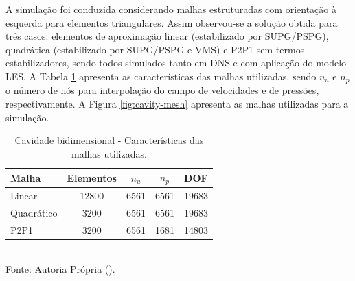 A simulação foi conduzida considerando malhas estruturadas com orientação à esquerda para elementos triangulares. Assim observou-se a solução obtida para três casos: elementos de aproximação linear (estabilizado por SUPG/PSPG), quadrática (estabilizado por SUPG/PSPG e VMS) e P2P1 sem termos estabilizadores, sendo todos simulados tanto em DNS e com aplicação do modelo LES. A Tabela \ref{tab:cavity-mesh} apresenta as características das malhas utilizadas, sendo $n_u$ e $n_p$ o número de nós para interpolação do campo de velocidades e de pressões, respectivamente. A Figura \ref{fig:cavity-mesh} apresenta as malhas utilizadas para a simulação.

\begin{table}[h!]
    \centering
    \caption{Cavidade bidimensional - Características das malhas utilizadas.}
    \begin{tabular}{lcccc}
        \hline
        Malha      & Elementos & $n_u$ & $n_p$ & DOF   \\\hline
        Linear     & 12800     & 6561  & 6561  & 19683 \\
        Quadrático & 3200      & 6561  & 6561  & 19683 \\
        P2P1       & 3200      & 6561  & 1681  & 14803 \\\hline
    \end{tabular}
    \\Fonte: Autoria Própria (\the\year).
    \label{tab:cavity-mesh}
\end{table}

